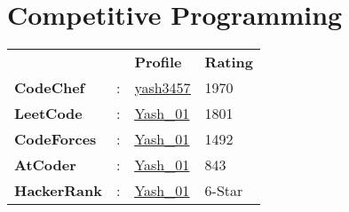 \documentclass[letterpaper,11pt]{article}
\begin{document}
\begin{minipage}[t]{0.35\textwidth}
  \section{Competitive Programming}
  \raggedleft
  \vspace{1pt}
  \renewcommand{\arraystretch}{1.2}
  \begin{tabular}{>{\raggedright}p{2.5cm} p{0.3cm} P{1.8cm} P{2cm}}
    {}                  & {} & \textbf{Profile}                                                          & \textbf{Rating} \\
    \textbf{CodeChef}   & :  & {\href{https://www.codechef.com/users/yash3457}{\underline{yash3457}}}    & 1970            \\
    \textbf{LeetCode}   & :  & {\href{https://leetcode.com/u/Yash_01/}{\underline{Yash\_01}}}            & 1801            \\
    \textbf{CodeForces} & :  & {\href{https://codeforces.com/profile/Yash_01}{\underline{Yash\_01}}}     & 1492            \\
    \textbf{AtCoder}    & :  & {\href{https://atcoder.jp/users/Yash_01}{\underline{Yash\_01}}}           & 843             \\
    \textbf{HackerRank} & :  & {\href{https://www.hackerrank.com/profile/Yash_01}{\underline{Yash\_01}}} & 6-Star          \\
  \end{tabular}

\end{minipage}
\end{document}
